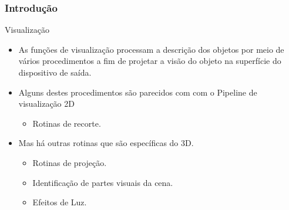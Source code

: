 \documentclass{beamer}
\begin{document}
\begin{frame}
\frametitle{Introdução}


	\begin{block}{Visualização}
		\begin{itemize}
			\item<1-> As funções de visualização processam a descrição dos objetos por meio de vários procedimentos a fim de projetar a visão do objeto na superfície do dispositivo de saída.
			\item<2-> Alguns destes procedimentos são parecidos com com o Pipeline de visualização 2D
				\begin{itemize}
					\item Rotinas de recorte.
				\end{itemize}
			\item Mas há outras rotinas que são específicas do 3D.
			\begin{itemize}
				\item Rotinas de projeção.
				\item Identificação de partes visuais da cena.
				\item Efeitos de Luz.
			\end{itemize}							 		 
		\end{itemize}
	\end{block}
	
\end{frame}
\end{document}
